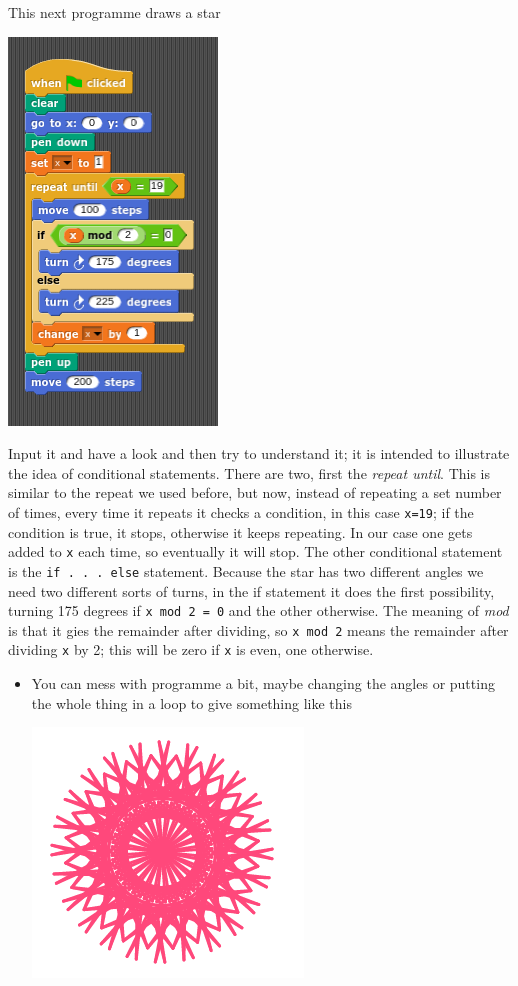 \documentclass[11pt,a4paper]{scrartcl}
\begin{document}
This next programme draws a star
\begin{center}
\includegraphics{star.png}
\end{center}
Input it and have a look and then try to understand it; it is intended
to illustrate the idea of conditional statements. There are two, first
the \textsl{repeat until}. This is similar to the repeat we used
before, but now, instead of repeating a set number of times, every
time it repeats it checks a condition, in this case \texttt{x=19}; if
the condition is true, it stops, otherwise it keeps repeating. In our
case one gets added to \texttt{x} each time, so eventually it will
stop. The other conditional statement is the \texttt{if . . . else}
statement. Because the star has two different angles we need two
different sorts of turns, in the if statement it does the first
possibility, turning 175 degrees if \texttt{x mod 2 = 0} and the other
otherwise. The meaning of \textsl{mod} is that it gies the remainder
after dividing, so \texttt{x mod 2} means the remainder after dividing
\texttt{x} by 2; this will be zero if \texttt{x} is even, one
otherwise. 

\begin{itemize}
\item You can mess with programme a bit, maybe changing the angles or
putting the whole thing in a loop to give something like this
\begin{center}
\includegraphics{rotating_star_pic.png}
\end{center}
\end{itemize}
\end{document}
